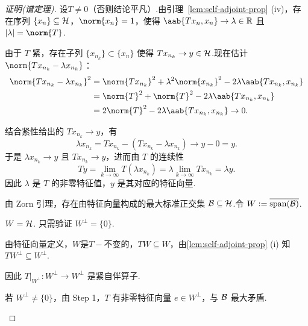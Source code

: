 \begin{proof}[证明(谱定理)]
 设$T\neq0$（否则结论平凡）.由引理~\ref{lem:self-adjoint-prop} (iv)，存在序列 $\{x_n\}\subseteq\mathcal{H}$，$\norm{x_n}=1$，使得 $\aab{Tx_n, x_n}\to\lambda\in\mb{R}$ 且 $|\lambda| = \norm{T}$.\par
由于 $T$ 紧，存在子列 $\{x_{n_k}\}\subset \{x_n\}$ 使得 $Tx_{n_k}\to y\in\mathcal{H}$.现在估计 $\norm{Tx_{n_k} - \lambda x_{n_k}}$：
\begin{align*}
\norm{Tx_{n_k} - \lambda x_{n_k}}^2
&= \norm{Tx_{n_k}}^2 + \lambda^2\norm{x_{n_k}}^2 - 2\lambda\aab{Tx_{n_k}, x_{n_k}}\\
&= \norm{T}^2 + \norm{T}^2 - 2\lambda\aab{Tx_{n_k}, x_{n_k}}\\
&= 2\norm{T}^2 - 2\lambda\aab{Tx_{n_k}, x_{n_k}}\to 0.
\end{align*}

结合紧性给出的 $Tx_{n_k}\to y$，有
\begin{equation*}
\lambda x_{n_k} = Tx_{n_k} - (Tx_{n_k} - \lambda x_{n_k}) \to y - 0 = y.
\end{equation*}
于是 $\lambda x_{n_k}\to y$ 且 $Tx_{n_k}\to y$，进而由 $T$ 的连续性
\begin{equation*}
Ty = \lim_{k\to\infty} T(\lambda x_{n_k}) = \lambda \lim_{k\to\infty} Tx_{n_k} = \lambda y.
\end{equation*}
因此 $\lambda$ 是 $T$ 的非零特征值，$y$ 是其对应的特征向量.\par
{} 由 Zorn 引理，存在由特征向量构成的最大标准正交集 $\mathcal{B}\subseteq\mathcal{H}$.令 $W:=\overline{\operatorname{span}(\mathcal{B})}$.
\begin{claim}{$W=\mathcal{H}$.}
  只需验证 $W^\perp = \{0\}$.\par
    由特征向量定义，$W$是$T-\!\!$不变的，$TW\subseteq W$，由\cref{lem:self-adjoint-prop} (i) 知 $TW^\perp\subseteq W^\perp$.\par
    因此 $T|_{W^\perp}: W^\perp\to W^\perp$ 是紧自伴算子.\par
    若 $W^\perp\neq\{0\}$，由 Step 1，$T$ 有非零特征向量 $e\in W^\perp$，与 $\mathcal{B}$ 最大矛盾.  
\end{claim}


\end{proof}
